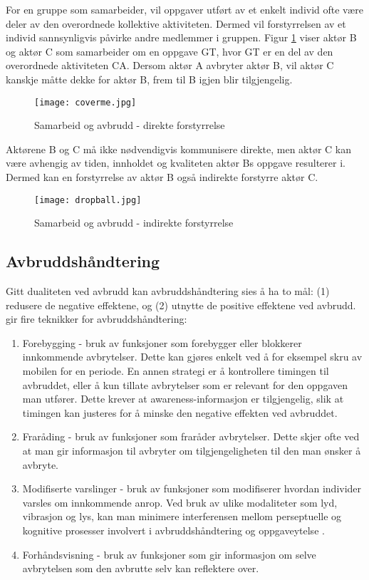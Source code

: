 \noindent
For en gruppe som samarbeider, vil oppgaver utført av et enkelt individ ofte være deler av den overordnede kollektive aktiviteten. Dermed vil forstyrrelsen av et individ sannsynligvis påvirke andre medlemmer i gruppen. Figur \ref{direkte} viser aktør B og aktør C som samarbeider om en oppgave GT, hvor GT er en del av den overordnede aktiviteten CA. Dersom aktør A avbryter aktør B, vil aktør C kanskje måtte dekke for aktør B, frem til B igjen blir tilgjengelig.
\begin{figure}[H]
\centering
\texttt{[image: coverme.jpg]}
\caption{Samarbeid og avbrudd - direkte forstyrrelse}
\label{direkte}
\end{figure}

\noindent
Aktørene B og C må ikke nødvendigvis kommunisere direkte, men aktør C kan være avhengig av tiden, innholdet og kvaliteten aktør Bs oppgave resulterer i. Dermed kan en forstyrrelse av aktør B også indirekte forstyrre aktør C.
\begin{figure}[H]
\centering
\texttt{[image: dropball.jpg]}
\caption{Samarbeid og avbrudd - indirekte forstyrrelse}
\label{indirekte}
\end{figure}

\subsection{Avbruddshåndtering}
Gitt dualiteten ved avbrudd kan avbruddshåndtering sies å ha to mål: (1) redusere de negative effektene, og (2) utnytte de positive effektene ved avbrudd. \citet{Grandhi10} gir fire teknikker for avbruddshåndtering:
\begin{enumerate}        
\item Forebygging - bruk av funksjoner som forebygger eller blokkerer innkommende avbrytelser. Dette kan gjøres enkelt ved å for eksempel skru av mobilen for en periode. En annen strategi er å kontrollere timingen til avbruddet, eller å kun tillate avbrytelser som er relevant for den oppgaven man utfører. Dette krever at awareness-informasjon er tilgjengelig, slik at timingen kan justeres for å minske den negative effekten ved avbruddet.

\item Fraråding - bruk av funksjoner som fraråder avbrytelser. Dette skjer ofte ved at man gir informasjon til avbryter om tilgjengeligheten til den man ønsker å avbryte. 

\item Modifiserte varslinger - bruk av funksjoner som modifiserer hvordan individer varsles om innkommende anrop. Ved bruk av ulike modaliteter som lyd, vibrasjon og lys, kan man minimere interferensen mellom perseptuelle og kognitive prosesser involvert i avbruddshåndtering og oppgaveytelse \citep{Harr07}.

\item Forhåndsvisning - bruk av funksjoner som gir informasjon om selve avbrytelsen som den avbrutte selv kan reflektere over.   
\end{enumerate}

